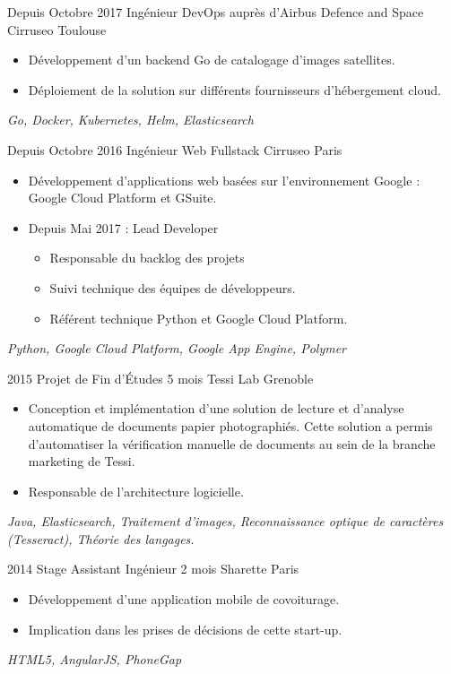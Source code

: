 \documentclass[11pt,a4paper,sans]{moderncv} %
\begin{document}
\cventry
    {Depuis Octobre 2017}
    {Ingénieur DevOps auprès d'Airbus Defence and Space}
    {}
    {Cirruseo}
    {Toulouse}
    {
        \begin{itemize}
            \item Développement d'un backend Go de catalogage d'images satellites.
            \item Déploiement de la solution sur différents fournisseurs d'hébergement cloud.
        \end{itemize}
        \textit{Go, Docker, Kubernetes, Helm, Elasticsearch}
    }
\vspace*{0.2cm}
\cventry
    {Depuis Octobre 2016}
    {Ingénieur Web Fullstack}
    {}
    {Cirruseo}
    {Paris}
    {
        \begin{itemize}
            \item Développement d'applications web basées sur l'environnement Google : Google Cloud Platform et GSuite.
            \item Depuis Mai 2017 : Lead Developer
            \begin{itemize}
                \item Responsable du backlog des projets
                \item Suivi technique des équipes de développeurs.
                \item Référent technique Python et Google Cloud Platform.
            \end{itemize}
        \end{itemize}
        \textit{Python, Google Cloud Platform, Google App Engine, Polymer}
    }
\vspace*{0.2cm}
\cventry
    {2015}
    {Projet de Fin d'Études}
    {5 mois}
    {Tessi Lab}
    {Grenoble}
    {
        \begin{itemize}
            \item Conception et implémentation d'une solution de lecture et d'analyse automatique de documents papier photographiés. Cette solution a permis d'automatiser la vérification manuelle de documents au sein de la branche marketing de Tessi.
            \item Responsable de l'architecture logicielle.
        \end{itemize}
        \vspace*{1mm}
        \textit{Java, Elasticsearch, Traitement d'images, Reconnaissance optique de caractères (Tesseract), Théorie des langages.}
    }
\vspace*{0.2cm}
\cventry
    {2014}
    {Stage Assistant Ingénieur}
    {2 mois}
    {Sharette}
    {Paris}
    {
        \begin{itemize}
            \item Développement d'une application mobile de covoiturage.
        \item Implication dans les prises de décisions de cette start-up.
        \end{itemize}
        \vspace*{1mm}
        \textit{HTML5, AngularJS, PhoneGap}
    }
\vspace*{0.2cm}
\end{document}
